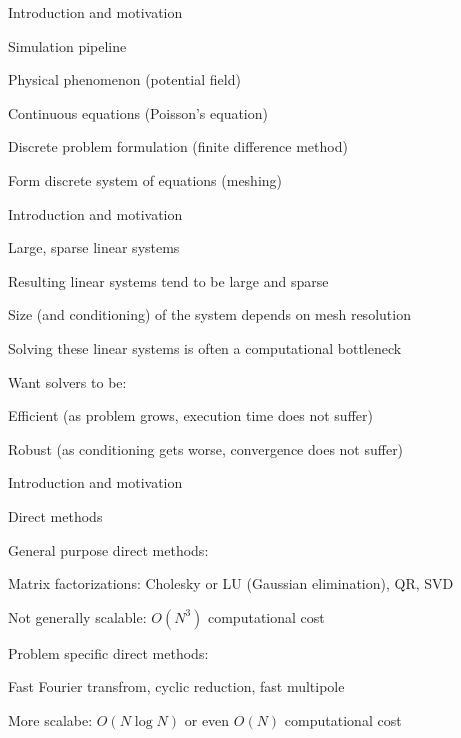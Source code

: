 \documentclass[18pt,xcolor=table]{beamer}
\begin{document}
\begin{frame}{Introduction and motivation}
\begin{block}{Simulation pipeline}
\bit
\item Physical phenomenon (potential field)
\item Continuous equations (Poisson's equation)
\item Discrete problem formulation (finite difference method)
\item Form discrete system of equations (meshing)
\eit
\end{block}
\end{frame}

\begin{frame}{Introduction and motivation}
\begin{block}{Large, sparse linear systems}
\bit
\item Resulting linear systems tend to be large and sparse
\item Size (and conditioning) of the system depends on mesh resolution
\item Solving these linear systems is often a computational bottleneck
\item Want solvers to be:
\bit
\item Efficient (as problem grows, execution time does not suffer)
\item Robust (as conditioning gets worse, convergence does not suffer)
\eit
\eit
\end{block}
\end{frame}

\begin{frame}{Introduction and motivation}
\begin{block}{Direct methods}
\bit
\item General purpose direct methods:
\bit
\item Matrix factorizations: Cholesky or LU (Gaussian elimination), QR, SVD 
\item Not generally scalable: $O(N^3)$ computational cost
\eit
\item Problem specific direct methods:
\bit
\item Fast Fourier transfrom, cyclic reduction, fast multipole
\item More scalabe: $O(N\log N)$ or even $O(N)$ computational cost
\eit
\eit
\end{block}
\end{frame}
\end{document}
